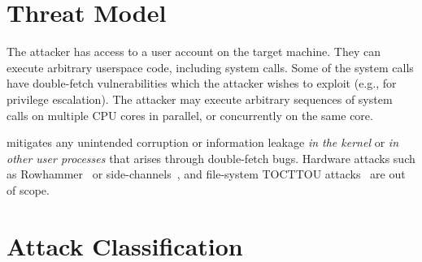 \documentclass[letterpaper,twocolumn,10pt]{article}
\begin{document}


\section{Threat Model}
\label{sec:threatmodel}

The attacker has access to a user account on the target machine. They can
execute arbitrary userspace code, including system calls. Some of the system
calls have double-fetch vulnerabilities which the attacker wishes to exploit
(e.g., for privilege escalation).
The attacker may execute arbitrary sequences of system calls on multiple CPU
cores in parallel, or concurrently on the same core.

\midas mitigates any unintended corruption or information leakage \emph{in the kernel}
or \emph{in other user processes} that arises through double-fetch bugs.
Hardware attacks such as Rowhammer~\cite{mutlu2019rowhammer}
or side-channels~\cite{kocher2019spectre}, and file-system TOCTTOU
attacks~\cite{payer2012protecting, pu2006methodical, wei2010modeling,
tsafrir2008portably} are out of scope.


\section{Attack Classification}
\label{sec:attacks}
\end{document}
